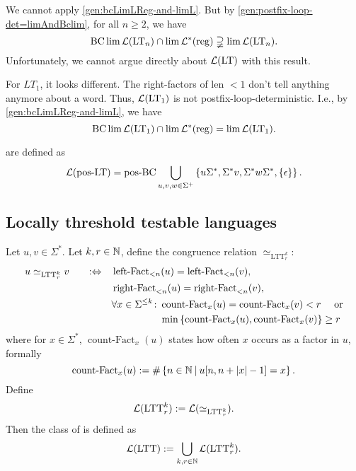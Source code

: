 We cannot apply \cref{gen:bcLimLReg-and-limL}.  But by \cref{gen:postfix-loop-det=limAndBclim}, for all $n \ge 2$, we have
\[ \operatorname{BC} \lim \mathcal{L}(\textup{\textrm{LT}}_n) \cap \lim \mathcal{L}^*(\textup{\textrm{reg}}) \supsetneqq \lim \mathcal{L}(\textup{\textrm{LT}}_n) . \]
Unfortunately, we cannot argue directly about $\mathcal{L}(\textup{\textrm{LT}})$ with this result.

For $LT_1$, it looks different. The right-factors of len $<1$ don't tell anything anymore about a word. Thus, $\mathcal{L}(\textup{\textrm{LT}}_1)$ is not postfix-loop-deterministic. I.e., by \cref{gen:bcLimLReg-and-limL}, we have
\[ \operatorname{BC} \lim \mathcal{L}(\textup{\textrm{LT}}_1) \cap \lim \mathcal{L}^*(\textup{\textrm{reg}}) = \lim \mathcal{L}(\textup{\textrm{LT}}_1) . \]


 are defined as
\[ \Lang(\mathtext{pos-LT}) = \operatorname{pos-BC} \bigcup_{u,v,w \in \Sigma^+} \Set{u\Sigma^*, \Sigma^* v, \Sigma^* w \Sigma^*, \Set{\epsilon}} . \]

\subsection{Locally threshold testable languages}
\label{lang:LTT}
Let $u,v \in \Sigma^*$. Let $k,r \in \mathbb{N}$, define the congruence relation $\simeq_{\text{LTT}^k_r}$:
\begin{alignat*}{3}
u \simeq_{\text{LTT}^k_r} v \ \ \ && :\Leftrightarrow \ \ \ & \operatorname{left-Fact}_{<n}(u) = \operatorname{left-Fact}_{<n}(v) , \\
&&& \operatorname{right-Fact}_{<n}(u) = \operatorname{right-Fact}_{<n}(v) , \\
&&& \begin{aligned}
\forall x \in \Sigma^{\le k} \colon & \operatorname{count-Fact}_x(u) = \operatorname{count-Fact}_x(v) < r \ \ \ \ \text{or} \\
& \min \Set{\operatorname{count-Fact}_x(u), \operatorname{count-Fact}_x(v)} \ge r
\end{aligned}
\end{alignat*}
where for $x \in \Sigma^*$, $\operatorname{count-Fact}_x(u)$ states how often $x$ occurs as a factor in $u$, formally
\[ \operatorname{count-Fact}_x(u) := \#\Set{n \in \N}{u[n,n+\vert x \vert - 1] = x} . \]
Define
\[ \mathcal{L}(\text{LTT}^k_r) := \mathcal{L}(\simeq_{\text{LTT}^k_r}). \]
Then the class of  is defined as
\[ \mathcal{L}(\textup{\textrm{LTT}}) := \bigcup_{k,r\in\mathbb{N}} \mathcal{L}(\text{LTT}^k_r) . \]


